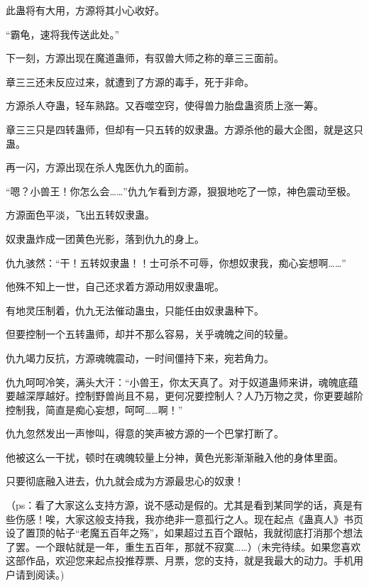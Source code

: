 \begin{this_body}
此蛊将有大用，方源将其小心收好。

“霸龟，速将我传送此处。”

下一刻，方源出现在魔道蛊师，有驭兽大师之称的章三三面前。

章三三还未反应过来，就遭到了方源的毒手，死于非命。

方源杀人夺蛊，轻车熟路。又吞噬空窍，使得兽力胎盘蛊资质上涨一筹。

章三三只是四转蛊师，但却有一只五转的奴隶蛊。方源杀他的最大企图，就是这只蛊。

再一闪，方源出现在杀人鬼医仇九的面前。

“嗯？小兽王！你怎么会……”仇九乍看到方源，狠狠地吃了一惊，神色震动至极。

方源面色平淡，飞出五转奴隶蛊。

奴隶蛊炸成一团黄色光影，落到仇九的身上。

仇九骇然：“干！五转奴隶蛊！！士可杀不可辱，你想奴隶我，痴心妄想啊……”

他殊不知上一世，自己还求着方源动用奴隶蛊呢。

有地灵压制着，仇九无法催动蛊虫，只能任由奴隶蛊种下。

但要控制一个五转蛊师，却并不那么容易，关乎魂魄之间的较量。

仇九竭力反抗，方源魂魄震动，一时间僵持下来，宛若角力。

仇九呵呵冷笑，满头大汗：“小兽王，你太天真了。对于奴道蛊师来讲，魂魄底蕴要越深厚越好。控制野兽尚且不易，更何况要控制人？人乃万物之灵，你更要越阶控制我，简直是痴心妄想，呵呵……啊！”

仇九忽然发出一声惨叫，得意的笑声被方源的一个巴掌打断了。

他被这么一干扰，顿时在魂魄较量上分神，黄色光影渐渐融入他的身体里面。

只要彻底融入进去，仇九就会成为方源最忠心的奴隶！

（ps：看了大家这么支持方源，说不感动是假的。尤其是看到某同学的话，真是有些伤感！唉，大家这般支持我，我亦绝非一意孤行之人。现在起点《蛊真人》书页设了置顶的帖子“老魔五百年之殇”，如果超过五百个跟帖，我就彻底打消那个想法了罢。一个跟帖就是一年，重生五百年，那就不寂寞……）(未完待续。如果您喜欢这部作品，欢迎您来起点投推荐票、月票，您的支持，就是我最大的动力。手机用户请到阅读。)

\end{this_body}

